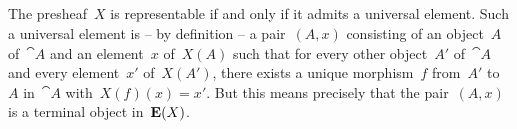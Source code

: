 \subsection{}

The presheaf~$X$ is representable if and only if it admits a universal element.
Such a universal element is -- by definition -- a pair~$(A, x)$ consisting of an object~$A$ of~$\cat{A}$ and an element~$x$ of~$X(A)$ such that for every other object~$A'$ of~$\cat{A}$ and every element~$x'$ of~$X(A')$, there exists a unique morphism~$f$ from~$A'$ to~$A$ in~$\cat{A}$ with~$X(f)(x) = x'$.
But this means precisely that the pair~$(A, x)$ is a terminal object in~$\operatorname{\mathbf{E}}(X)$.
